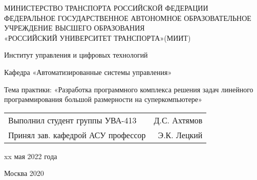 \begin{titlepage}
    \newpage
    \begin{center}
    МИНИСТЕРСТВО ТРАНСПОРТА РОССИЙСКОЙ ФЕДЕРАЦИИ\\
    \vspace{4ex}
    ФЕДЕРАЛЬНОЕ ГОСУДАРСТВЕННОЕ АВТОНОМНОЕ ОБРАЗОВАТЕЛЬНОЕ\\ 
    УЧРЕЖДЕНИЕ ВЫСШЕГО ОБРАЗОВАНИЯ\\
    «РОССИЙСКИЙ УНИВЕРСИТЕТ ТРАНСПОРТА»(МИИТ)\\
    \vspace{7ex}
    
    Институт управления и цифровых технологий\\
    \vspace{4ex}
    
    Кафедра «Автоматизированные системы управления»\\

    \vspace{12ex}
    
    \fontsize{16bp}{20bp}
    \vspace{7ex}
     
    \fontsize{12bp}{14bp}\selectfont
    Тема практики: «Разработка программного комплекса решения задач линейного программирования 
    большой размерности на суперкомпьютере»
    \end{center}

    \vspace{7ex}
    
    \begin{flushright}
        \begin{tabular}{lr@{}} %
            \fontsize{12bp}{18bp}\selectfont
            Выполнил студент группы УВА-413    &  Д.С. Ахтямов\\
            Принял зав. кафедрой АСУ профессор &  Э.К. Лецкий\\    
        \end{tabular}

        \vspace{2.5ex}
        xx мая 2022 года
    \end{flushright}
    
    \vfill
    
    \begin{center} Москва 2020 \end{center}
    \thispagestyle{empty} %
     
\end{titlepage}
